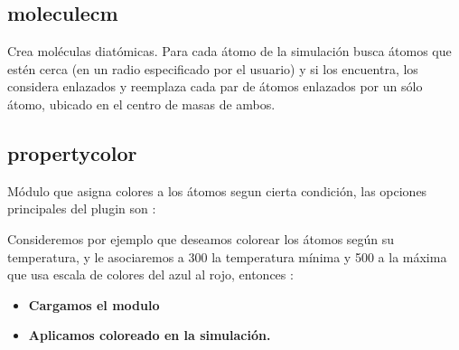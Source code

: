 \subsection{moleculecm}

Crea mol\'eculas diat\'omicas. Para cada \'atomo de la simulaci\'on busca \'atomos que est\'en cerca (en un radio especificado por el usuario) y si los encuentra, los considera enlazados y reemplaza cada par de \'atomos enlazados por un s\'olo \'atomo, ubicado en el centro de masas de ambos.



\subsection{propertycolor}
M\'odulo que asigna colores a los \'atomos segun cierta condici\'on, las opciones principales del plugin son :


Consideremos por ejemplo que deseamos colorear los \'atomos seg\'un su temperatura, y le asociaremos a 300 la temperatura m\'inima y 500 a la m\'axima que usa escala de colores del azul al rojo, entonces :

\begin{itemize}
 \item \textbf{Cargamos el modulo}
 \item \textbf{Aplicamos coloreado en la simulaci\'on.}
\end{itemize}

